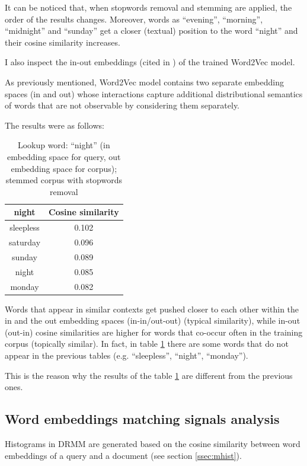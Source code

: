 It can be noticed that, when stopwords removal and stemming are applied, the order of the results changes. Moreover, words as ``evening'', ``morning'', ``midnight'' and ``sunday'' get a closer (textual) position to the word ``night'' and their cosine similarity increases.

I also inspect the in-out embeddings (cited in \cite{Mitra2016ADE}) of the trained Word2Vec model.

As previously mentioned, Word2Vec model contains two separate embedding spaces (in and out) whose interactions capture additional distributional semantics of words that are not observable by considering them separately.

The results were as follows:

\begin{table}[H]
\centering
\begin{tabular}{cc}
\hline
\textbf{night} & \textbf{Cosine similarity} \\ \hline
sleepless & 0.102 \\
saturday & 0.096 \\
sunday & 0.089 \\
night & 0.085 \\
monday & 0.082\\
\hline
\end{tabular}
\caption{Lookup word: ``night'' (in embedding space for query, out embedding space for corpus); stemmed corpus with stopwords removal}
\label{tab:embsim2}
\end{table}

Words that appear in similar contexts get pushed closer to each other within the in and the out embedding spaces (in-in/out-out) (typical similarity), while in-out (out-in) cosine similarities are higher for words that co-occur often in the training corpus (topically similar). In fact, in table \ref{tab:embsim2} there are some words that do not appear in the previous tables (e.g. ``sleepless'', ``night'', ``monday'').

This is the reason why the results of the table \ref{tab:embsim2} are different from the previous ones.

\subsection{Word embeddings matching signals analysis}

Histograms in DRMM are generated based on the cosine similarity between word embeddings of a query and a document (see section \ref{ssec:mhist}).

